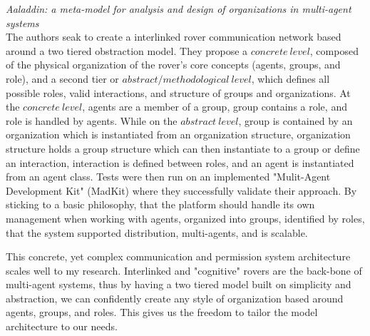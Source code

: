 \textit{Aaladdin: a meta-model for analysis and design of organizations in multi-agent systems}~\cite{ferber1998meta} \\

The authors seak to create a interlinked rover communication network based around a two tiered obstraction model. They propose a $concrete~level$, composed of the physical organization of the rover's core concepts (agents, groups, and role), and a second tier or $abstract/methodological~level$, which defines all possible roles, valid interactions, and structure of groups and organizations. At the $concrete~level$, agents are a member of a group, group contains a role, and role is handled by agents. While on the $abstract~level$, group is contained by an organization which is instantiated from an organization structure, organization structure holds a group structure which can then instantiate to a group or define an interaction, interaction is defined between roles, and an agent is instantiated from an agent class. Tests were then run on an implemented "Mulit-Agent Development Kit" (MadKit) where they successfully validate their approach. By sticking to a basic philosophy, that the platform should handle its own management when working with agents, organized into groups, identified by roles, that the system supported distribution, multi-agents, and is scalable.

This concrete, yet complex communication and permission system architecture scales well to my research. Interlinked and "cognitive" rovers are the back-bone of multi-agent systems, thus by having a two tiered model built on simplicity and abstraction, we can confidently create any style of organization based around agents, groups, and roles. This gives us the freedom to tailor the model architecture to our needs.